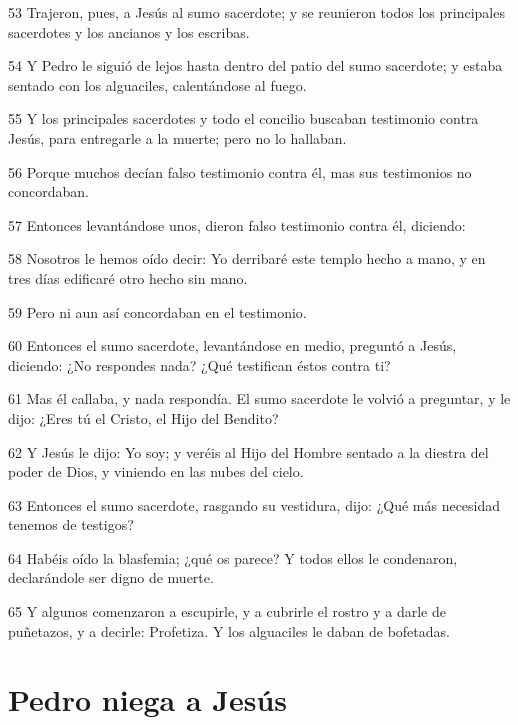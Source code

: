 \par 53 Trajeron, pues, a Jesús al sumo sacerdote; y se reunieron todos los principales sacerdotes y los ancianos y los escribas.
\par 54 Y Pedro le siguió de lejos hasta dentro del patio del sumo sacerdote; y estaba sentado con los alguaciles, calentándose al fuego.
\par 55 Y los principales sacerdotes y todo el concilio buscaban testimonio contra Jesús, para entregarle a la muerte; pero no lo hallaban.
\par 56 Porque muchos decían falso testimonio contra él, mas sus testimonios no concordaban.
\par 57 Entonces levantándose unos, dieron falso testimonio contra él, diciendo:
\par 58 Nosotros le hemos oído decir: Yo derribaré este templo hecho a mano, y en tres días edificaré otro hecho sin mano.
\par 59 Pero ni aun así concordaban en el testimonio.
\par 60 Entonces el sumo sacerdote, levantándose en medio, preguntó a Jesús, diciendo: ¿No respondes nada? ¿Qué testifican éstos contra ti?
\par 61 Mas él callaba, y nada respondía. El sumo sacerdote le volvió a preguntar, y le dijo: ¿Eres tú el Cristo, el Hijo del Bendito?
\par 62 Y Jesús le dijo: Yo soy; y veréis al Hijo del Hombre sentado a la diestra del poder de Dios, y viniendo en las nubes del cielo.
\par 63 Entonces el sumo sacerdote, rasgando su vestidura, dijo: ¿Qué más necesidad tenemos de testigos?
\par 64 Habéis oído la blasfemia; ¿qué os parece? Y todos ellos le condenaron, declarándole ser digno de muerte.
\par 65 Y algunos comenzaron a escupirle, y a cubrirle el rostro y a darle de puñetazos, y a decirle: Profetiza. Y los alguaciles le daban de bofetadas.

\section*{Pedro niega a Jesús}

